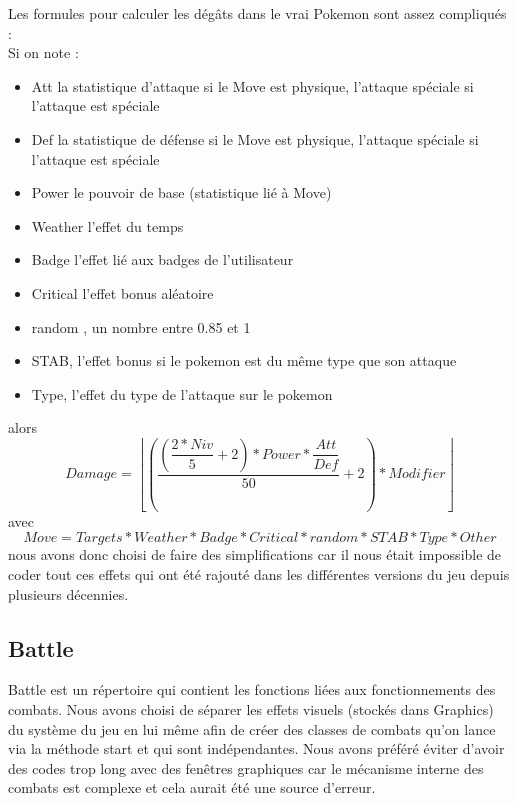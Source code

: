 \documentclass[a4paper,twoside, openany,11pt]{book}
\newcommand{\Floor}[1]{\left\lfloor #1 \right\rfloor}
\begin{document}
Les formules pour calculer les dégâts dans le vrai Pokemon sont assez compliqués :\\
Si on note :
\begin{itemize}
\item Att la statistique d'attaque si le Move est physique, l'attaque spéciale si l'attaque est spéciale
\item Def la statistique de défense si le Move est physique, l'attaque spéciale si l'attaque est spéciale
\item Power le pouvoir de base (statistique lié à Move)
\item Weather l'effet du temps
\item Badge l'effet lié aux badges de l'utilisateur
\item Critical l'effet bonus aléatoire 
\item random , un nombre entre 0.85 et 1
\item STAB, l'effet bonus si le pokemon est du même type que son attaque
\item Type, l'effet du type de l'attaque sur le pokemon
\end{itemize}
alors 
\[
Damage = \Floor{\left(\dfrac{\left(\dfrac{2 * Niv}{5} + 2\right) * Power * \dfrac{Att}{Def}}{50} + 2 \right) * Modifier}
\]
avec
\[
Move = Targets * Weather * Badge * Critical * random * STAB * Type * Other
\]
nous avons donc choisi de faire des simplifications car il nous était impossible de coder tout ces effets qui ont été rajouté dans les différentes versions du jeu depuis plusieurs décennies.


\subsection{Battle}
Battle est un répertoire qui contient les fonctions liées aux fonctionnements des combats. Nous avons choisi de séparer les effets visuels (stockés dans Graphics) du système du jeu en lui même afin de créer des classes de combats qu'on lance via la méthode start et qui sont indépendantes. Nous avons préféré éviter d'avoir des codes trop long avec des fenêtres graphiques car le mécanisme interne des combats est complexe et cela aurait été une source d'erreur.
\end{document}
